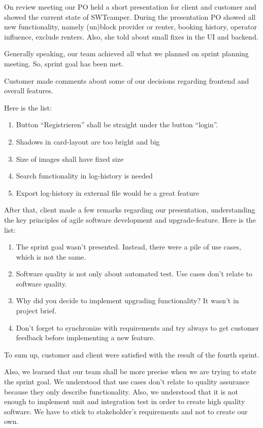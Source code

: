 On review meeting our PO held a short presentation for client and customer and showed the current state of SWTcamper. During the presentation PO showed all new functionality, namely (un)block provider or renter, booking history, operator influence, exclude renters. Also, she told about small fixes in the UI and backend. 

Generally speaking, our team achieved all what we planned on sprint planning meeting. So, sprint goal has been met.

Customer made comments about some of our decisions regarding frontend and overall features. 

Here is the list:

\begin{enumerate}
	\item Button “Registrieren” shall be straight under the button “login”.
	\item Shadows in card-layout are too bright and big
	\item Size of images shall have fixed size
	\item Search functionality in log-history is needed 
	\item Export log-history in external file would be a great feature
\end{enumerate}

\quad After that, client made a few remarks regarding our presentation, understanding the key principles of agile software development and upgrade-feature. Here is the list:
\begin{enumerate}
	\item The sprint goal wasn’t presented. Instead, there were a pile of use cases, which is not the same. 
	\item Software quality is not only about automated test. Use cases don’t relate to software quality.
	\item Why did you decide to implement upgrading functionality? It wasn’t in project brief.
	\item Don’t forget to synchronize with requirements and try always to get customer feedback before implementing a new feature.
\end{enumerate}

To sum up, customer and client were satisfied with the result of the fourth sprint.


Also, we learned that our team shall be more precise when we are trying to state
the sprint goal. We understood that use cases don’t relate to quality assurance because they only describe functionality. Also, we understood that it is not enough to implement unit and integration test in order to create high quality software. We have to stick to stakeholder’s requirements and not to create our own. 

